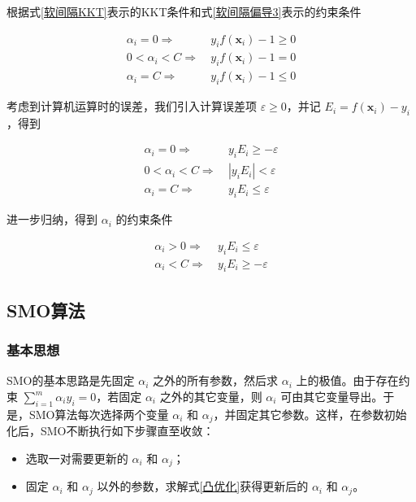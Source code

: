 \documentclass{ctexart}
\begin{document}
	根据式\eqref{软间隔KKT}表示的KKT条件和式\eqref{软间隔偏导3}表示的约束条件
	
	\begin{equation}
		\begin{aligned}
			\alpha_i=0\Rightarrow&\ y_if(\boldsymbol{x}_i)-1\geqslant 0\\
			0<\alpha_i<C\Rightarrow&\ y_if(\boldsymbol{x}_i)-1= 0\\
			\alpha_i=C\Rightarrow&\ y_if(\boldsymbol{x}_i)-1\leqslant 0
		\end{aligned}
	\end{equation}
	
	考虑到计算机运算时的误差，我们引入计算误差项 $\varepsilon\geqslant 0$，并记 $E_i=f(\boldsymbol{x}_i)-y_i$，得到
	
	\begin{equation}
		\begin{aligned}
			\alpha_i=0\Rightarrow&\ y_iE_i\geqslant -\varepsilon\\
			0<\alpha_i<C\Rightarrow&\ \left|y_iE_i\right|< \varepsilon\\
			\alpha_i=C\Rightarrow&\ y_iE_i\leqslant \varepsilon
		\end{aligned}
	\end{equation}

	进一步归纳，得到 $\alpha_i$ 的约束条件
	
	\begin{equation}
		\begin{aligned}
			\alpha_i>0\Rightarrow&\ y_iE_i\leqslant\varepsilon\\
			\alpha_i<C\Rightarrow&\ y_iE_i\geqslant-\varepsilon
		\end{aligned}
		\label{alpha约束}
	\end{equation}

	\subsection{SMO算法}
	\subsubsection{基本思想}
	SMO的基本思路是先固定 $\alpha_i$ 之外的所有参数，然后求 $\alpha_i$ 上的极值。由于存在约束 $\sum\limits_{i=1}^m\alpha_iy_i=0$，若固定 $\alpha_i$ 之外的其它变量，则 $\alpha_i$ 可由其它变量导出。于是，SMO算法每次选择两个变量 $\alpha_i$ 和 $\alpha_j$，并固定其它参数。这样，在参数初始化后，SMO不断执行如下步骤直至收敛：
	
	\begin{itemize}
		\item 选取一对需要更新的 $\alpha_i$ 和 $\alpha_j$；
		\item 固定 $\alpha_i$ 和 $\alpha_j$ 以外的参数，求解式\eqref{凸优化}获得更新后的 $\alpha_i$ 和 $\alpha_j$。
	\end{itemize}
\end{document}

